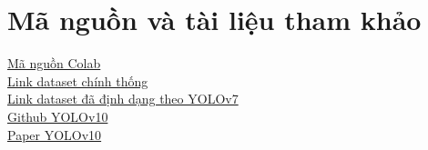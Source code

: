 \section{Mã nguồn và tài liệu tham khảo}
\href{https://colab.research.google.com/drive/1FOSz6e9F2uOTFiB6gteMiklTc6aOFNJY?usp=sharing}{Mã nguồn Colab} \\
\href{https://universe.roboflow.com/minoj-selvaraj/furniture-sfocl.}{Link dataset chính thống} \\
\href{https://linkvertise.com/720390/yolov8-funiture-dataset?o=sharing}{Link dataset đã định dạng theo YOLOv7} \\ 
\href{https://github.com/ultralytics/ultralytics/blob/main/docs/en/models/yolov10.md}{Github YOLOv10} \\
\href{https://arxiv.org/pdf/2405.14458}{Paper YOLOv10}

